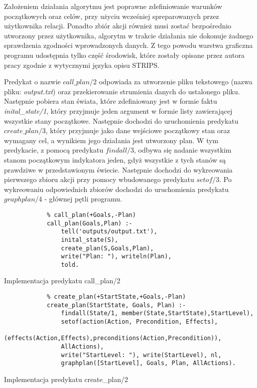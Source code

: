     Założeniem działania algorytmu jest poprawne zdefiniowanie warunków początkowych oraz celów, przy użyciu wcześniej spreparowanych przez użytkownika 
    relacji. Ponadto zbiór akcji również musi zostać bezpośrednio utworzony przez użytkownika, algorytm w trakcie działania nie dokonuje żadnego 
    sprawdzenia zgodności wprowadzonych danych. Z tego powodu warstwa graficzna programu udostępnia tylko część środowisk, które zostały opisane przez 
    autora pracy zgodnie z wytycznymi języka opisu STRIPS.

    Predykat o nazwie $call\_plan/2$ odpowiada za utworzenie pliku tekstowego (nazwa pliku: \textit{output.txt}) oraz przekierowanie strumienia danych 
    do ustalonego pliku. Następnie pobiera stan świata, które zdefiniowany jest w formie faktu \textit{inital\_state/1}, który przyjmuje jeden argument
    w formie listy zawierającej wszystkie stany początkowe. Następnie dochodzi do uruchomienia predykatu $create\_plan/3$, który przyjmuje jako dane
    wejściowe początkowy stan oraz wymagany cel, a wynikiem jego działania jest utworzony plan. W tym predykacie, z pomocą predykatu $findall/3$,
    odbywa się nadanie wszystkim stanom początkowym indykatora jeden, gdyż wszystkie z tych stanów są prawdziwe w przedstawionym świecie. 
    Następnie dochodzi do wykreowania pierwszego zbioru akcji przy pomocy wbudowanego predykatu $setof/3$. Po wykreowaniu odpowiednich zbiorów 
    dochodzi do uruchomienia predykatu $graphplan/4$ - głównej pętli programu.

    \begin{listing}[H]
        \begin{verbatim}
            % call_plan(+Goals,-Plan)
            call_plan(Goals,Plan) :-
                tell('outputs/output.txt'),
                inital_state(S),
                create_plan(S,Goals,Plan),
                write("Plan: "), writeln(Plan),
                told.
        \end{verbatim}
        \caption{Implementacja predykatu call\_plan/2}
    \end{listing}

    \begin{listing}[H]
        \begin{verbatim}
            % create_plan(+StartState,+Goals,-Plan)
            create_plan(StartState, Goals, Plan) :-
                findall(State/1, member(State,StartState),StartLevel),
                setof(action(Action, Precondition, Effects), 
                (effects(Action,Effects),preconditions(Action,Precondition)),
                AllActions),
                write("StartLevel: "), write(StartLevel), nl,
                graphplan([StartLevel], Goals, Plan, AllActions).
    \end{verbatim}
    \caption{Implementacja predykatu create\_plan/2}
    \end{listing}

